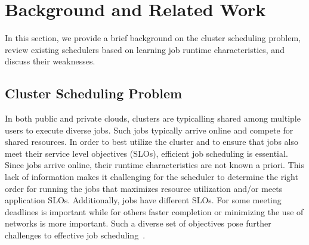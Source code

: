 \section{Background and Related Work}
\label{sec:back}

In this section, we provide a brief background on the cluster scheduling problem,
review existing schedulers based on learning job runtime characteristics, and
discuss their weaknesses.

\subsection{Cluster Scheduling Problem}
\label{sec:back:problem}



In both public and private clouds,
clusters are typicalling shared among multiple users to execute diverse jobs. Such
jobs typically arrive online and compete for shared resources. In order to best
utilize the cluster and to ensure that jobs also meet their service level
objectives (SLOs), efficient job scheduling is essential. Since jobs arrive online,
their runtime characteristics are not known a priori. This lack of information
makes it challenging for the scheduler to determine the right order for running
the jobs that maximizes resource utilization and/or meets application 
SLOs. Additionally, jobs have different SLOs. For some
meeting deadlines is important while for others faster completion or minimizing
the use of networks is more important. Such a diverse set of objectives pose
further challenges to effective job
scheduling~\cite{drf:nsdi11,jockey:eurosys2012, shufflewatcher, corral,
morpheus, delay:eurosys10, cdef:atc18}.

